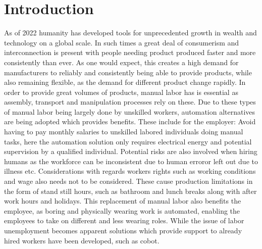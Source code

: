 \chapter{Introduction}\label{ch:intro}


As of 2022 humanity has developed tools for unprecedented growth in wealth and technology on a global scale. In such times a great deal of consumerism and interconnection is present with people needing product produced faster and more consistently than ever. 
As one would expect, this creates a high demand for manufacturers to reliably and consistently being able to provide products, while also remaining flexible, as the demand for different product change rapidly. 
In order to provide great volumes of products, manual labor has is essential as assembly, transport and manipulation processes rely on these. Due to these types of manual labor being largely done by unskilled workers, automation alternatives are being adopted which provides benefits. 
These include for the employer: Avoid having to pay monthly salaries to unskilled labored individuals doing manual tasks, here the automation solution only requires electrical energy and potential supervision by a qualified individual. Potential risks are also involved when hiring humans as the workforce can be inconsistent due to human error\fakecite or left out due to illness etc. Considerations with regards workers rights such as working conditions and wage also needs not to be considered. These cause production limitations in the form of stand still hours, such as bathroom and lunch breaks along with after work hours and holidays. 
This replacement of manual labor also benefits the employee, as boring and physically wearing work is automated, enabling the employees to take on different and less wearing roles. While the issue of labor unemployment becomes apparent solutions which provide support to already hired workers have been developed, such as \gls{cobot}\fakecite. \medskip

